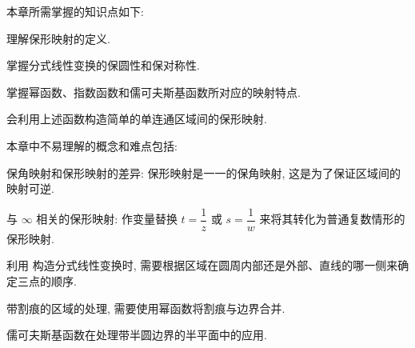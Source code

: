 
本章所需掌握的知识点如下:
\begin{enumpar}
  \item 理解保形映射的定义.
  \item 掌握分式线性变换的保圆性和保对称性.
  \item 掌握幂函数、指数函数和儒可夫斯基函数所对应的映射特点.
  \item 会利用上述函数构造简单的单连通区域间的保形映射.
\end{enumpar}

本章中不易理解的概念和难点包括:
\begin{enumpar}
  \item 保角映射和保形映射的差异: 保形映射是一一的保角映射, 这是为了保证区域间的映射可逆.
  \item 与 $\infty$ 相关的保形映射: 作变量替换 $t=\dfrac1z$ 或 $s=\dfrac1w$ 来将其转化为普通复数情形的保形映射.
  \item 利用 构造分式线性变换时, 需要根据区域在圆周内部还是外部、直线的哪一侧来确定三点的顺序.
  \item 带割痕的区域的处理, 需要使用幂函数将割痕与边界合并.
  \item 儒可夫斯基函数在处理带半圆边界的半平面中的应用.
\end{enumpar}


